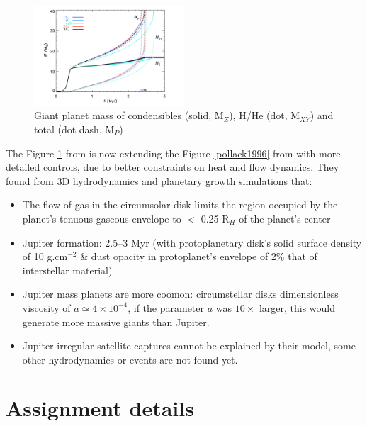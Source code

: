 \documentclass[12pt]{article} %
\begin{document}
\begin{figure}
\begin{center}
 \includegraphics[width=0.5\textwidth,keepaspectratio=true]{./images/lissauer2014}
 \caption{Giant planet mass of condensibles (solid, M$_Z$), H/He (dot, M$_{XY}$) and total (dot dash, M$_P$)  \cite{lissauer2009models}}
 \label{lissauer2014}
\end{center}
\end{figure}


\noindent The Figure \ref{lissauer2014}  from \cite{lissauer2009models} is now extending the Figure \ref{pollack1996} from \cite{pollack1996formation}  with more detailed controls, due to better constraints on heat and flow dynamics. They found from 3D hydrodynamics and planetary growth simulations that: 

\begin{itemize}
\setlength\itemsep{0em}
\item  The flow of gas in the circumsolar disk limits the region occupied by the planet’s tenuous gaseous envelope to $<$
 0.25 R$_H$ of the planet’s center
 \item Jupiter formation: 2.5–3 Myr (with protoplanetary disk's solid surface density of 10 g.cm$^{-2}$ \& dust opacity in
protoplanet’s envelope of 2\% that of interstellar material)
\item Jupiter mass planets are more coomon: circumstellar disks dimensionless viscosity of $a \simeq 4 \times 10 ^{-4}$, if the parameter $a$ was $10 \times$ larger, this would generate more massive giants than Jupiter.
\item Jupiter irregular satellite captures cannot be explained by their model, some other hydrodynamics or events are not found yet. 
\end{itemize}

\clearpage
\section{Assignment details}\vspace{-2ex}\titlerule[1pt]\bigskip
\end{document}
